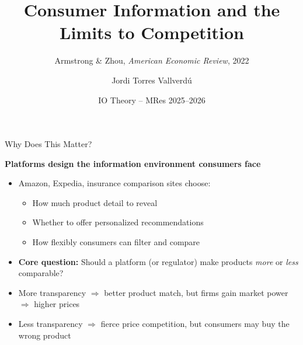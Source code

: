 \documentclass[aspectratio=169, 11pt]{beamer}
\title[Armstrong \& Zhou (2022)]{Consumer Information and the Limits to Competition}
\subtitle{Armstrong \& Zhou, \textit{American Economic Review}, 2022}
\author{Jordi Torres Vallverd\'{u}}
\institute{Toulouse School of Economics}
\date{IO Theory -- MRes 2025--2026}
\begin{document}
\begin{frame}
\titlepage
\end{frame}


\begin{frame}{Why Does This Matter?}

\textbf{Platforms design the information environment consumers face}

\bigskip

\begin{itemize}
    \item Amazon, Expedia, insurance comparison sites choose:
    \begin{itemize}
        \item How much product detail to reveal
        \item Whether to offer personalized recommendations
        \item How flexibly consumers can filter and compare
    \end{itemize}

    \bigskip

    \item \textbf{Core question:} Should a platform (or regulator) make products \emph{more} or \emph{less} comparable?

    \bigskip

    \item More transparency $\Rightarrow$ better product match, but firms gain market power $\Rightarrow$ higher prices

    \item Less transparency $\Rightarrow$ fierce price competition, but consumers may buy the wrong product
\end{itemize}

\end{frame}
\end{document}
